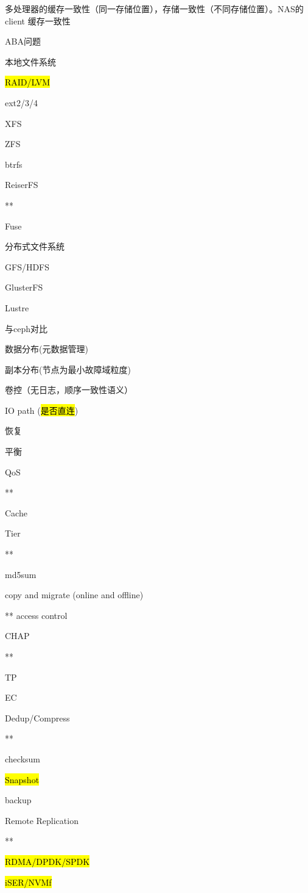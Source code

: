 多处理器的缓存一致性（同一存储位置），存储一致性（不同存储位置）。NAS的client 缓存一致性

ABA问题

本地文件系统
\begin{enumbox}
\item \hl{RAID/LVM}
\item ext2/3/4
\item XFS
\item ZFS
\item btrfs
\item ReiserFS
\item ***
\item Fuse
\end{enumbox}

分布式文件系统
\begin{enumbox}
\item GFS/HDFS
\item GlusterFS
\item Lustre
\end{enumbox}

与ceph对比
\begin{enumbox}
\item 数据分布(元数据管理)
\item 副本分布(节点为最小故障域粒度)
\item 卷控（无日志，顺序一致性语义）
\item IO path (\hl{是否直连})
\item 恢复
\item 平衡
\item QoS
\item ***
\item Cache
\item Tier
\item ***
\item md5sum
\item copy and migrate (online and offline)
\item *** access control
\item CHAP
\item ***
\item TP
\item EC
\item Dedup/Compress
\item ***
\item checksum
\item \hl{Snapshot}
\item backup
\item Remote Replication
\item ***
\item \hl{RDMA/DPDK/SPDK}
\item \hl{iSER/NVMf}
\end{enumbox}

